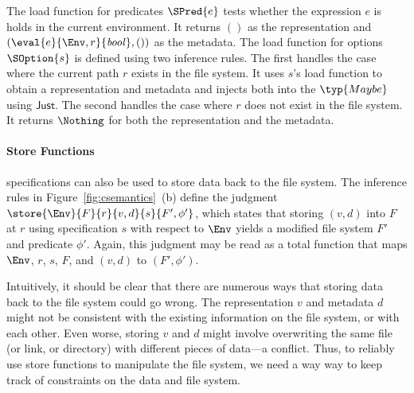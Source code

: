 The load function for predicates $\SPred{e}$ tests whether the
expression $e$ is holds in the current environment. It returns $()$ as
the representation and $(\eval{e}{\Env,r}{\mathit{bool}},())$ as the
metadata. The load function for options $\SOption{s}$ is defined using
two inference rules. The first handles the case where the current path
$r$ exists in the file system. It uses $s$'s load function to obtain a
representation and metadata and injects both into the $\typ{Maybe}$
using $\mathsf{Just}$. The second handles the case where $r$ does not
exist in the file system. It returns $\Nothing$ for both the
representation and the metadata.

\paragraph*{Store Functions}
%
\forest{} specifications can also be used to store data back to the
file system. The inference rules in Figure~\ref{fig:csemantics}~(b)
define the judgment $\store{\Env}{F}{r}{v,d}{s}{F',\phi'}$, which
states that storing $(v,d)$ into $F$ at $r$ using specification $s$
with respect to $\Env$ yields a modified file system $F'$ and
predicate $\phi'$. Again, this judgment may be read as a total
function that maps $\Env$, $r$, $s$, $F$, and $(v,d)$ to $(F',\phi')$.

Intuitively, it should be clear that there are numerous ways that
storing data back to the file system could go wrong. The
representation $v$ and metadata $d$ might not be consistent with the
existing information on the file system, or with each other. Even
worse, storing $v$ and $d$ might involve overwriting the same file (or
link, or directory) with different pieces of data---a conflict. Thus,
to reliably use store functions to manipulate the file system, we need
a way way to keep track of constraints on the data and file system.


